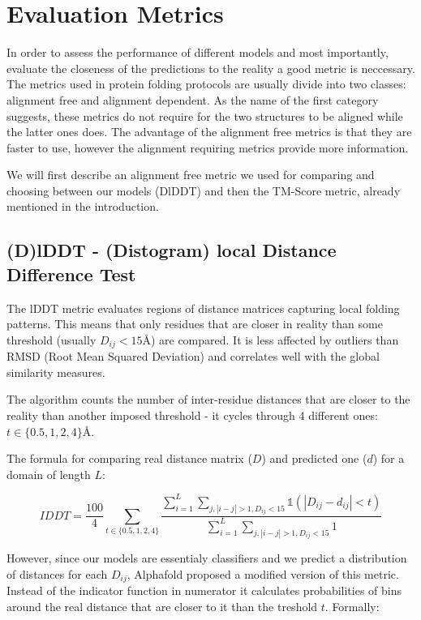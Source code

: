\section{Evaluation Metrics}

In order to assess the performance of different models and most importantly, evaluate the closeness of the predictions to the reality a good metric is neccessary. The metrics used in protein folding protocols are usually divide into two classes: alignment free and alignment dependent. As the name of the first category suggests, these metrics do not require for the two structures to be aligned while the latter ones does. The advantage of the alignment free metrics is that they are faster to use, however the alignment requiring metrics provide more information. 

We will first describe an alignment free metric we used for comparing and choosing between our models (DlDDT) and then the TM-Score metric, already mentioned in the introduction.

\subsection{(D)lDDT - (Distogram) local Distance Difference Test}

The lDDT metric evaluates regions of distance matrices capturing local folding patterns. This means that only residues that are closer in reality than some threshold (usually $D_{ij} < 15$\AA) are compared. It is less affected by outliers than RMSD (Root Mean Squared Deviation) and correlates well with the global similarity measures.

The algorithm counts the number of inter-residue distances that are closer to the reality than another imposed threshold - it cycles through 4 different ones: $t \in \{0.5, 1, 2, 4\}$\AA \cite{lddt}.

The formula for comparing real distance matrix ($D$) and predicted one ($d$) for a domain of length $L$:

$$IDDT = \frac{100}{4} \sum_{t \in \{0.5, 1, 2, 4\}} \frac
{\sum_{i = 1}^L \sum_{j, |i - j| > 1, D_{ij} < 15} \mathds{1}(|D_{ij} - d_{ij}| < t)}
{\sum_{i = 1}^L \sum_{j, |i - j| > 1, D_{ij} < 15} 1} $$

However, since our models are essentialy classifiers and we predict a distribution of distances for each $D_{ij}$, Alphafold proposed a modified version of this metric. Instead of the indicator function in numerator it calculates probabilities of bins around the real distance that are closer to it than the treshold $t$. Formally:

